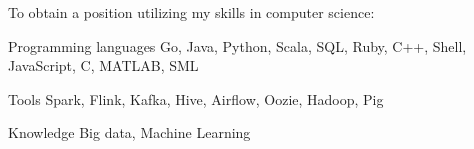 

\begin{cvparagraph}

To obtain a position utilizing my skills in computer science:

\begin{cvskills}

  \cvskill
    {Programming languages} %
    {Go, Java, Python, Scala, SQL, Ruby, C++, Shell, JavaScript, C, MATLAB, SML} %

  \cvskill
    {Tools} %
    {Spark, Flink, Kafka, Hive, Airflow, Oozie, Hadoop, Pig} %

  \cvskill
    {Knowledge} %
    {Big data, Machine Learning} %

\end{cvskills}


\end{cvparagraph}

